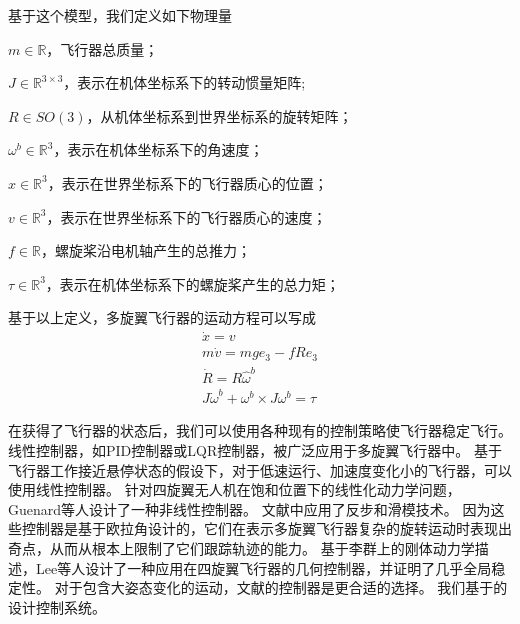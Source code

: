 \documentclass[
  type=master
]{gdutthesis}
\begin{document}
基于这个模型，我们定义如下物理量

$m \in \mathbb{R}$，飞行器总质量；

$J \in \mathbb{R}^{3 \times 3}$，表示在机体坐标系下的转动惯量矩阵;

$R \in SO(3)$，从机体坐标系到世界坐标系的旋转矩阵；

$\omega^b \in \mathbb{R}^3$，表示在机体坐标系下的角速度；

$x \in \mathbb{R}^3$，表示在世界坐标系下的飞行器质心的位置；

$v \in \mathbb{R}^3$，表示在世界坐标系下的飞行器质心的速度；

$f \in \mathbb{R}$，螺旋桨沿电机轴产生的总推力；

$\tau \in \mathbb{R}^3$，表示在机体坐标系下的螺旋桨产生的总力矩；

基于以上定义，多旋翼飞行器的运动方程可以写成
\begin{gather}\label{eq:dynamics}
		\dot{x} = v\\
		m\dot{v} = mge_3 - fRe_3\\
		\dot{R} = R\hat{\omega}^b\\
		J\dot{\omega}^b + \omega^b \times J \omega^b = \tau
\end{gather}

在获得了飞行器的状态后，我们可以使用各种现有的控制策略使飞行器稳定飞行。
线性控制器，如PID控制器或LQR控制器，被广泛应用于多旋翼飞行器中\cite{hoffmann2007quadrotor,castillo2004stabilization,nice2004design}。
基于飞行器工作接近悬停状态的假设下，对于低速运行、加速度变化小的飞行器，可以使用线性控制器。
针对四旋翼无人机在饱和位置下的线性化动力学问题，Guenard等人设计了一种非线性控制器\cite{guenard2005dynamic}。
文献\cite{bouabdallah2005backstepping}中应用了反步和滑模技术。
因为这些控制器是基于欧拉角设计的，它们在表示多旋翼飞行器复杂的旋转运动时表现出奇点，从而从根本上限制了它们跟踪轨迹的能力。
基于李群上的刚体动力学描述，Lee等人设计了一种应用在四旋翼飞行器的几何控制器，并证明了几乎全局稳定性\cite{lee2010geometric}。
对于包含大姿态变化的运动，文献\cite{lee2010geometric}的控制器是更合适的选择。
我们基于\cite{lee2010geometric}的设计控制系统。
\end{document}
